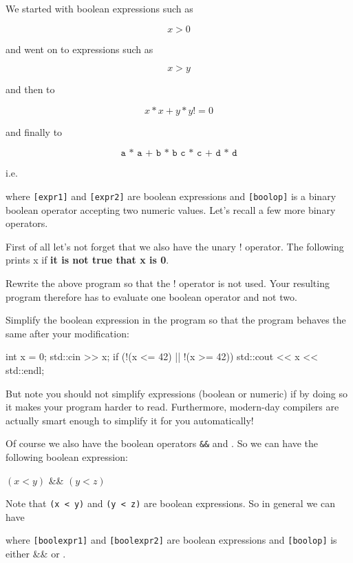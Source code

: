 We started with boolean expressions such as

\[x > 0\]

and went on to expressions such as

\[x > y\]

and then to

\[x * x + y * y != 0\]

and finally to

\[\texttt{a * a + b * b  c * c + d * d}\]

i.e.
\begin{center}
\EMPHASIZE{\texttt{[expr1] [boolop] [expr2]}}
\end{center}
where \texttt{[expr1]} and \texttt{[expr2]} are boolean expressions
and \texttt{[boolop]} is a binary boolean operator accepting two
numeric values. Let's recall a few more binary operators.

First of all let's not forget that we also have the unary ! operator. The following prints x if \textbf{it is not true that x is 0}.

\begin{ex}
Rewrite the above program so that the ! operator is
not used. Your resulting program therefore has to evaluate one boolean
operator and not two.
\end{ex}
\begin{ex}
Simplify the boolean expression in the program so
that the program behaves the same after your modification:
\begin{console}
int x = 0;
std::cin >> x;
if (!(x <= 42) || !(x >= 42))
   std::cout << x << std::endl;
\end{console}
\end{ex}

But note you should not simplify expressions (boolean or numeric) if by
doing so it makes your program harder to read. Furthermore, modern-day
compilers are actually smart enough to simplify it for you
automatically!

Of course we also have the boolean operators \texttt{\&\&} and
\texttt{\textbar\textbar}. So we can have the following boolean
expression:
\begin{center}
$(x < y)$   \&\&  $(y < z)$
\end{center}
Note that \texttt{(x < y)} and \texttt{(y < z)} are
boolean expressions. So in general we can have
\begin{center}
\EMPHASIZE{\texttt{[boolexpr1] [boolop] [boolexpr2]}}
\end{center}
where \texttt{[boolexpr1]} and \texttt{[boolexpr2]} are boolean
expressions and \texttt{[boolop]} is either \&\& or \textbar\textbar.

